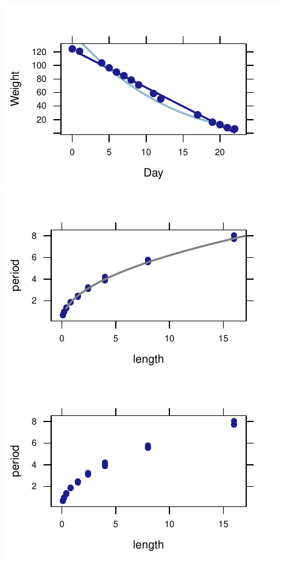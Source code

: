 \documentclass[twoside]{book}\usepackage[]{graphicx}\usepackage[]{xcolor}
\makeatletter
\def\maxwidth{ %
  \ifdim\Gin@nat@width>\linewidth
    \linewidth
  \else
    \Gin@nat@width
  \fi
}
\newenvironment{knitrout}{}{} %
\makeatother
\begin{document}
\begin{solution}
\begin{knitrout}
{\centering \includegraphics[width=\maxwidth]{figures/fig-unnamed-chunk-210-1} 
\includegraphics[width=\maxwidth]{figures/fig-unnamed-chunk-210-2} 
\includegraphics[width=\maxwidth]{figures/fig-unnamed-chunk-210-3} 
}
\end{knitrout}
\end{solution}
\end{document}
